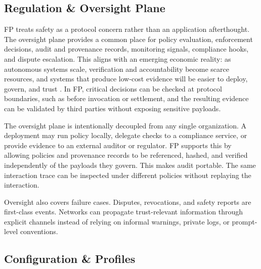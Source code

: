 \documentclass{llmxive}
\begin{document}

\subsection{Regulation \& Oversight Plane}
\label{subsec:oversight}

FP treats safety as a protocol concern rather than an application afterthought. The oversight plane provides a common place for policy evaluation, enforcement decisions, audit and provenance records, monitoring signals, compliance hooks, and dispute escalation. This aligns with an emerging economic reality: as autonomous systems scale, verification and accountability become scarce resources, and systems that produce low-cost evidence will be easier to deploy, govern, and trust \cite{agi_economics}. In FP, critical decisions can be checked at protocol boundaries, such as before invocation or settlement, and the resulting evidence can be validated by third parties without exposing sensitive payloads.

The oversight plane is intentionally decoupled from any single organization. A deployment may run policy locally, delegate checks to a compliance service, or provide evidence to an external auditor or regulator. FP supports this by allowing policies and provenance records to be referenced, hashed, and verified independently of the payloads they govern. This makes audit portable. The same interaction trace can be inspected under different policies without replaying the interaction.

Oversight also covers failure cases. Disputes, revocations, and safety reports are first-class events. Networks can propagate trust-relevant information through explicit channels instead of relying on informal warnings, private logs, or prompt-level conventions.


\subsection{Configuration \& Profiles}
\label{subsec:profiles}
\end{document}

